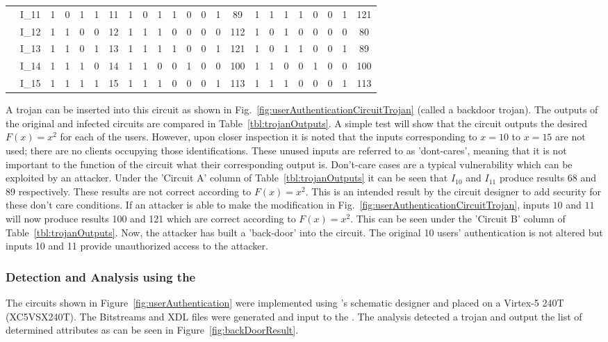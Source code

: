 \begin{table}[]
\begin{tabular}{CC|C|C|C|C|C||C|C|C|C|C|C|C|C||C|C|C|C|C|C|C|C|}
		 & I_{11} & 1 & 0 & 1 & 1 & 11 & 1 & 0 & 1 & 1 & 0 & 0 & 1 & 89 & 1 & 1 & 1 & 1 & 0 & 0 & 1 & 121 \\ 
		 & I_{12} & 1 & 1 & 0 & 0 & 12 & 1 & 1 & 1 & 0 & 0 & 0 & 0 & 112 & 1 & 0 & 1 & 0 & 0 & 0 & 0 & 80 \\ 
		 & I_{13} & 1 & 1 & 0 & 1 & 13 & 1 & 1 & 1 & 1 & 0 & 0 & 1 & 121 & 1 & 0 & 1 & 1 & 0 & 0 & 1 & 89 \\ 
		 & I_{14} & 1 & 1 & 1 & 0 & 14 & 1 & 1 & 0 & 0 & 1 & 0 & 0 & 100 & 1 & 1 & 0 & 0 & 1 & 0 & 0 & 100 \\ 
		 & I_{15} & 1 & 1 & 1 & 1 & 15 & 1 & 1 & 1 & 0 & 0 & 0 & 1 & 113 & 1 & 1 & 1 & 0 & 0 & 0 & 1 & 113 \\ \hline
	\end{tabular}
\end{table}
A trojan can be inserted into this circuit as shown in Fig.~\ref{fig:userAuthenticationCircuitTrojan} (called a backdoor trojan).
The outputs of the original and infected circuits are compared in Table~\ref{tbl:trojanOutputs}.
A simple test will show that the circuit outputs the desired $F(x) = x^2$ for each of the users.
However, upon closer inspection it is noted that the inputs corresponding to $x = 10$ to $x = 15$ are not used; there are no clients occupying those identifications.
These unused inputs are referred to as 'dont-cares', meaning that it is not important to the function of the circuit what their corresponding output is.
Don't-care cases are a typical vulnerability which can be exploited by an attacker.
Under the 'Circuit A' column of Table~\ref{tbl:trojanOutputs} it can be seen that $I_{10}$ and $I_{11}$ produce results 68 and 89 respectively.
These results are not correct according to $F(x) = x^2$.
This is an intended result by the circuit designer to add security for these don't care conditions.
If an attacker is able to make the modification in Fig.~\ref{fig:userAuthenticationCircuitTrojan}, inputs $10$ and $11$ will now produce results 100 and 121 which are correct according to $F(x) = x^2$.
This can be seen under the 'Circuit B' column of Table~\ref{tbl:trojanOutputs}.
Now, the attacker has built a 'back-door' into the circuit.
The original 10 users' authentication is not altered but inputs 10 and 11 provide unauthorized access to the attacker.

\subsubsection{Detection and Analysis using the \Name}
The circuits shown in Figure~\ref{fig:userAuthentication} were implemented using \Xilinx's schematic designer and placed on a Virtex-5 240T (XC5VSX240T).
The \gls{Bitstream}s and \acrshort{XDL} files were generated and input to the \Name.
The analysis detected a trojan and output the list of determined attributes as can be seen in Figure~\ref{fig:backDoorResult}.


